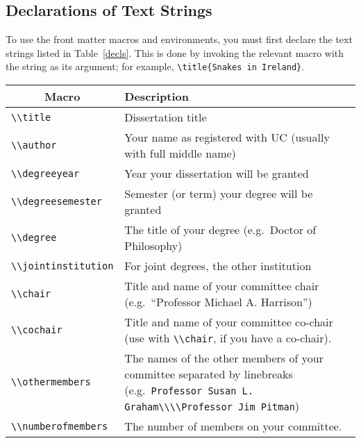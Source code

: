 \documentclass[11pt]{article}
\begin{document}
\subsection{Declarations of Text Strings}

To use the front matter macros and environments, you must first
declare the text strings listed in Table~\ref{decls}.  This is done
by invoking the relevant macro with the string as its argument;
for example, \lstinline|\title{Snakes in Ireland}|.

\begin{table}
\centering
\lstset{basicstyle=\ttfamily}
\begin{tabularx}{.9\textwidth}{lX}
\toprule
\multicolumn{1}{c}{Macro} & \multicolumn{1}{l}{Description} \\
\midrule
\lstinline|\\title| & Dissertation title \\
\lstinline|\\author| & Your name as registered with UC (usually with full
  middle name) \\
\lstinline|\\degreeyear| & Year your dissertation will be granted \\
\lstinline|\\degreesemester| & Semester (or term) your degree will be granted \\
\lstinline|\\degree| & The title of your degree (e.g.~Doctor of Philosophy) \\
\lstinline|\\jointinstitution| & For joint degrees, the other institution \\
\lstinline|\\chair| & Title and name of your committee chair
  (e.g.~``Professor Michael A. Harrison'') \\
\lstinline|\\cochair| & Title and name of your committee co-chair
  (use with \lstinline|\\chair|, if you have a co-chair). \\
\lstinline|\\othermembers| & The names of the other members of your committee
  separated by linebreaks
  (e.g.~\lstinline!Professor Susan L. Graham\\\\Professor Jim Pitman!) \\
\lstinline|\\numberofmembers| & The number of members on your committee.

\end{tabularx}
\end{table}
\end{document}
